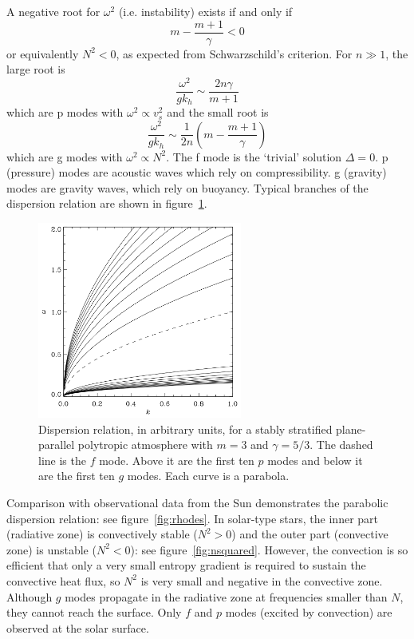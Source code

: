 \documentclass{jknotes}
\begin{document}
A negative root for $\omega^2$ (i.e. instability) exists if and only if
\begin{equation}
	m - \frac{m+1}{\gamma} < 0
\end{equation}
or equivalently $N^2 < 0$, as expected from Schwarzschild's criterion. For $n
\gg 1$, the large root is
\begin{equation}
	\frac{\omega^2}{gk_h} \sim \frac{2n\gamma}{m+1}
\end{equation}
which are p modes with $\omega^2 \propto v_s^2$ and the small root is
\begin{equation}
	\frac{\omega^2}{gk_h} \sim \frac{1}{2n}\left(m - \frac{m+1}{\gamma}\right)
\end{equation}
which are g modes with $\omega^2 \propto N^2$. The f mode is the `trivial'
solution $\Delta = 0$. p (pressure) modes are acoustic waves which rely on
compressibility. g (gravity) modes are gravity waves, which rely on buoyancy.
Typical branches of the dispersion relation are shown in figure~\ref{fig:pgf}.

\begin{figure}[h]
	\centering
	\includegraphics[width=0.6\textwidth]{pgf_modes.png}
	\caption{Dispersion relation, in arbitrary units, for a stably stratified
	plane-parallel polytropic atmosphere with $m=3$ and $\gamma = 5/3$.
	The dashed line is the $f$ mode. Above it are the first ten $p$ modes
	and below it are the first ten $g$ modes. Each curve is a parabola.
	}
	\label{fig:pgf}
\end{figure}

Comparison with observational data from the Sun demonstrates the parabolic
dispersion relation: see figure~\ref{fig:rhodes}. In solar-type stars, the
inner part (radiative zone) is convectively stable ($N^2 > 0$) and the outer
part (convective zone) is unstable ($N^2 < 0$): see figure~\ref{fig:nsquared}.
However, the convection is so efficient that only a very small entropy
gradient is required to sustain the convective heat flux, so $N^2$ is very
small and negative in the convective zone. Although $g$ modes propagate in the
radiative zone  at frequencies smaller than $N$, they cannot reach the
surface. Only $f$ and $p$ modes (excited by convection) are observed at the
solar surface. 
\end{document}
